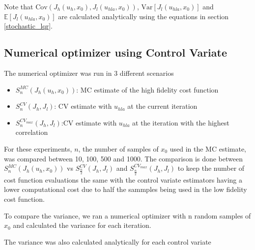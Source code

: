 \documentclass{article}
\begin{document}
Note that $\text{Cov}(J_h(u_h, x_0), J_l(u_{hla}, x_0))$, $\text{Var}[J_l(u_{hla}, x_0)]$ and $\mathbb{E}[J_l(u_{hla}, x_0)]$ are calculated analytically using the equations in section \ref{stochastic_lqr}.

\subsection{Numerical optimizer using Control Variate}

The numerical optimizer was run in 3 different scenarios

\begin{itemize}
  \item $S_n^{MC}(J_h(u_h, x_0))$: MC estimate of the high fidelity cost function
  \item $S_n^{CV}(J_h, J_l)$: CV estimate with $u_{hla}$ at the current iteration
  \item $S_n^{CV_{max}}(J_h, J_l)$:CV estimate with $u_{hla}$ at the iteration with the highest correlation
\end{itemize}

For these experiments, $n$, the number of samples of $x_0$ used in the MC estimate, was compared between 10, 100, 500 and 1000.
The comparison is done between $S_n^{MC}(J_h(u_h, x_0))$ vs $S_{\frac{n}{2}}^{CV}(J_h, J_l)$ and $S_{\frac{n}{2}}^{CV_{max}}(J_h, J_l)$ to keep the number of cost function evaluations the same with the control variate estimators having a lower computational cost due to half the sammples being used in the low fidelity cost function.

To compare the variance, we ran a numerical optimizer with n random samples of $x_0$ and calculated the variance for each iteration.

The variance was also calculated analytically for each control variate
\end{document}
